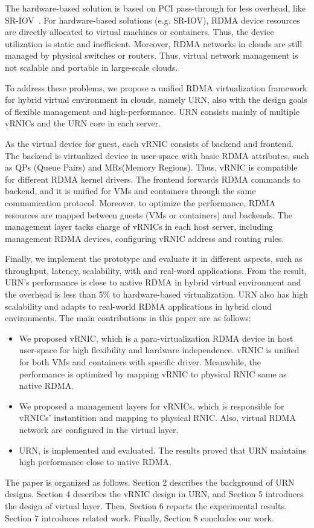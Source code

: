 The hardware-based solution is based on PCI pass-through for less overhead, like SR-IOV~\cite{sr-iov}. For hardware-based solutions (e.g. SR-IOV), RDMA device resources are directly allocated to virtual machines or containers. Thus, the device utilization is static and inefficient. Moreover, RDMA networks in clouds are still managed by physical switches or routers. Thus, virtual network management is not scalable and portable in large-scale clouds.

To address these problems, we propose a unified RDMA virtualization framework for hybrid virtual environment in clouds, namely URN, also with the design goals of flexible management and high-performance. URN consists mainly of multiple vRNICs and the URN core in each server.

As the virtual device for guest, each vRNIC consists of backend and frontend. The backend is virtualized device in user-space with basic RDMA attributes, such as QPs (Queue Pairs) and MRs(Memory Regions). Thus, vRNIC is compatible for different RDMA kernel drivers. The frontend forwards RDMA commands to backend, and it is unified for VMs and containers through the same communication protocol. Moreover, to optimize the performance, RDMA resources are mapped between guests (VMs or containers) and backends. The management layer tacks charge of vRNICs in each host server, including management RDMA devices, configuring vRNIC address and routing rules. 

Finally, we implement the prototype and evaluate it in different aspects, such as throughput, latency, scalability, with and real-word applications. From the result, URN's performance is close to native RDMA in hybrid virtual environment and the overhead is less than 5\% to hardware-based virtualization. URN also has high scalability and adapts to real-world RDMA applications in hybrid cloud environments. The main contributions in this paper are as follows:

\begin{itemize}
\item We proposed vRNIC, which is a para-virtualization RDMA device in host user-space for high flexibility and hardware independence. vRNIC is unified for both VMs and containers with specific driver. Meanwhile, the performance is optimized by mapping vRNIC to physical RNIC same as native RDMA.

\item We proposed a management layers for vRNICs, which is responsible for vRNICs' instantition and mapping to physical RNIC. Also, virtual RDMA network are configured in the virtual layer.

\item URN, is implemented and evaluated. The results proved that URN maintains high performance close to native RDMA.
\end{itemize}

The paper is organized as follows. Section 2 describes the background of URN designs. Section 4 describes the vRNIC design in URN, and Section 5 introduces the design of virtual layer. Then, Section 6 reports the experimental results. Section 7 introduces related work. Finally, Section 8 concludes our work.
